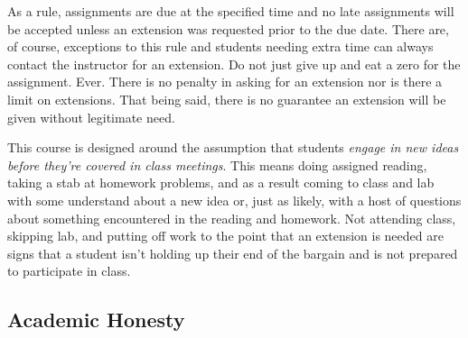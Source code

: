 \documentclass[10pt]{article}
\begin{document}

As a rule, assignments are due at the specified time and no late assignments will be accepted unless an extension was requested prior to the due date. There are, of course, exceptions to this rule and students needing extra time can always contact the instructor for an extension. Do not just give up and eat a zero for the assignment. Ever. There is no penalty in asking for an extension nor is there a limit on extensions.  That being said, there is no guarantee an extension will be given without legitimate need.

This course is designed around the assumption that students \textit{engage in new ideas before they're covered in class meetings}.  This means doing assigned reading, taking a stab at homework problems, and as a result coming to class and lab with some understand about a new idea or, just as likely, with a host of questions about something encountered in the reading and homework. Not attending class, skipping lab, and putting off work to the point that an extension is needed are signs that a student isn't holding up their end of the bargain and is not prepared to participate in class.

\subsection{Academic Honesty}
\end{document}
